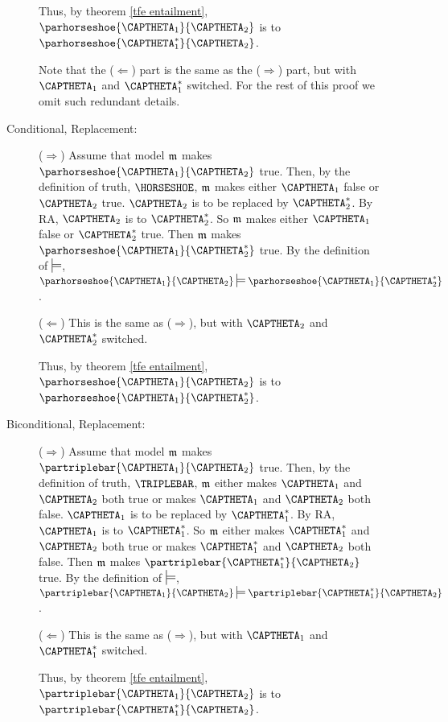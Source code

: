 \begin{PROOF}
\begin{description}
\begin{description}
	Thus, by theorem \ref{tfe entailment}, $\parhorseshoe{\CAPTHETA_1}{\CAPTHETA_2}$ is \tfe to $\parhorseshoe{\CAPTHETA_1^*}{\CAPTHETA_2}$.
	\begin{commentary}
		Note that the ($\Leftarrow$) part is the same as the ($\Rightarrow$) part, but with $\CAPTHETA_1$ and $\CAPTHETA_1^*$ switched.
		For the rest of this proof we omit such redundant details.
	\end{commentary}

	\item[Conditional, \rhs Replacement:] ($\Rightarrow$) Assume that model $\mathfrak{m}$ makes $\parhorseshoe{\CAPTHETA_1}{\CAPTHETA_2}$ true.
	Then, by the definition of truth, $\HORSESHOE$, $\mathfrak{m}$ makes either $\CAPTHETA_1$ false or $\CAPTHETA_2$ true.
	$\CAPTHETA_2$ is to be replaced by $\CAPTHETA_2^*$.
	By RA, $\CAPTHETA_2$ is \tfe to $\CAPTHETA_2^*$.
	So $\mathfrak{m}$ makes either $\CAPTHETA_1$ false or $\CAPTHETA_2^*$ true.
	Then $\mathfrak{m}$ makes $\parhorseshoe{\CAPTHETA_1}{\CAPTHETA_2^*}$ true.
	By the definition of $\entails$, $\parhorseshoe{\CAPTHETA_1}{\CAPTHETA_2}\entails\parhorseshoe{\CAPTHETA_1}{\CAPTHETA_2^*}$.

	($\Leftarrow$) This is the same as ($\Rightarrow$), but with $\CAPTHETA_2$ and $\CAPTHETA_2^*$ switched.

	Thus, by theorem \ref{tfe entailment}, $\parhorseshoe{\CAPTHETA_1}{\CAPTHETA_2}$ is \tfe to $\parhorseshoe{\CAPTHETA_1}{\CAPTHETA_2^*}$.

	\item[Biconditional, \lhs Replacement:] ($\Rightarrow$) Assume that model $\mathfrak{m}$ makes $\partriplebar{\CAPTHETA_1}{\CAPTHETA_2}$ true.
	Then, by the definition of truth, $\TRIPLEBAR$, $\mathfrak{m}$ either makes $\CAPTHETA_1$ and $\CAPTHETA_2$ both true or makes $\CAPTHETA_1$ and $\CAPTHETA_2$ both false.
	$\CAPTHETA_1$ is to be replaced by $\CAPTHETA_1^*$.
	By RA, $\CAPTHETA_1$ is \tfe to $\CAPTHETA_1^*$.
	So $\mathfrak{m}$ either makes $\CAPTHETA_1^*$ and $\CAPTHETA_2$ both true or makes $\CAPTHETA_1^*$ and $\CAPTHETA_2$ both false.
	Then $\mathfrak{m}$ makes $\partriplebar{\CAPTHETA_1^*}{\CAPTHETA_2}$ true.
	By the definition of $\entails$, $\partriplebar{\CAPTHETA_1}{\CAPTHETA_2}\entails\partriplebar{\CAPTHETA_1^*}{\CAPTHETA_2}$.

	($\Leftarrow$) This is the same as ($\Rightarrow$), but with $\CAPTHETA_1$ and $\CAPTHETA_1^*$ switched.

	Thus, by theorem \ref{tfe entailment}, $\partriplebar{\CAPTHETA_1}{\CAPTHETA_2}$ is \tfe to $\partriplebar{\CAPTHETA_1^*}{\CAPTHETA_2}$.


\end{description}
\end{description}
\end{PROOF}
